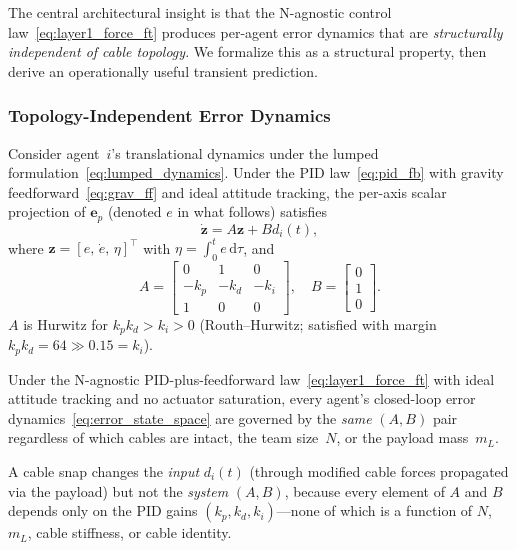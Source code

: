 The central architectural insight is that the N-agnostic control law~\eqref{eq:layer1_force_ft} produces per-agent error dynamics that are \emph{structurally independent of cable topology}. We formalize this as a structural property, then derive an operationally useful transient prediction.

\subsubsection{Topology-Independent Error Dynamics}

Consider agent~$i$'s translational dynamics under the lumped formulation~\eqref{eq:lumped_dynamics}. Under the PID law~\eqref{eq:pid_fb} with gravity feedforward~\eqref{eq:grav_ff} and ideal attitude tracking, the per-axis scalar projection of $\bm{e}_p$ (denoted $e$ in what follows) satisfies
\begin{equation}\label{eq:error_state_space}
  \dot{\bm{z}} = A \bm{z} + B d_i(t),
\end{equation}
where $\bm{z} = [e,\, \dot{e},\, \eta]^\top$ with $\eta = \int_0^t e\,\mathrm{d}\tau$, and
\begin{equation}\label{eq:AB_matrices}
  A = \begin{bmatrix} 0 & 1 & 0 \\ -k_p & -k_d & -k_i \\ 1 & 0 & 0 \end{bmatrix}, \quad
  B = \begin{bmatrix} 0 \\ 1 \\ 0 \end{bmatrix}.
\end{equation}
$A$ is Hurwitz for $k_p k_d > k_i > 0$ (Routh--Hurwitz; satisfied with margin $k_p k_d = 64 \gg 0.15 = k_i$).

\begin{proposition}\label{thm:topology_invariance}
Under the N-agnostic PID-plus-feedforward law~\eqref{eq:layer1_force_ft} with ideal attitude tracking and no actuator saturation, every agent's closed-loop error dynamics~\eqref{eq:error_state_space} are governed by the \emph{same} $(A, B)$ pair regardless of which cables are intact, the team size~$N$, or the payload mass~$m_L$.

A cable snap changes the \emph{input} $d_i(t)$ (through modified cable forces propagated via the payload) but not the \emph{system} $(A, B)$, because every element of $A$ and $B$ depends only on the PID gains $(k_p, k_d, k_i)$---none of which is a function of $N$, $m_L$, cable stiffness, or cable identity.
\end{proposition}


